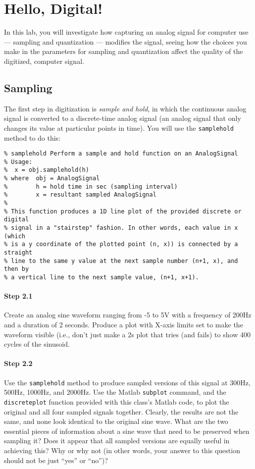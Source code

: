 
\section{Hello, Digital!}

In this lab, you will investigate how capturing an analog signal for
computer use --- sampling and quantization --- modifies the signal,
seeing how the choices you make in the parameters for sampling and
quantization affect the quality of the digitized, computer signal.

\subsection{Sampling}

The first step in digitization is \emph{sample and hold}, in which the
continuous analog signal is converted to a discrete-time analog signal
(an analog signal that only changes its value at particular points in
time). You will use the \texttt{samplehold} method to do this:
\begin{verbatim}
% samplehold Perform a sample and hold function on an AnalogSignal
% Usage:
%  x = obj.samplehold(h)
% where  obj = AnalogSignal
%        h = hold time in sec (sampling interval)
%        x = resultant sampled AnalogSignal
%
% This function produces a 1D line plot of the provided discrete or digital
% signal in a "stairstep" fashion. In other words, each value in x (which
% is a y coordinate of the plotted point (n, x)) is connected by a straight
% line to the same y value at the next sample number (n+1, x), and then by
% a vertical line to the next sample value, (n+1, x+1).
\end{verbatim}

\paragraph{Step 2.1} Create an analog sine waveform ranging from -5 to
5V with a frequency of 200Hz and a duration of 2 seconds. Produce a
plot with X-axis limits set to make the waveform visible (i.e., don't
just make a 2s plot that tries (and fails) to show 400 cycles of the
sinusoid.

\paragraph{Step 2.2} Use the \texttt{samplehold} method to produce
sampled versions of this signal at 300Hz, 500Hz, 1000Hz, and
2000Hz. Use the Matlab \texttt{subplot} command, and the
\texttt{discreteplot} function provided with this class's Matlab code,
to plot the original and all four sampled signals together. Clearly,
the results are not the same, and none look identical to the original
sine wave. What are the two essential pieces of information about a
sine wave that need to be preserved when sampling it? Does it appear
that all sampled versions are equally useful in achieving this? Why or
why not (in other words, your answer to this question should not be
just ``yes'' or ``no'')?

